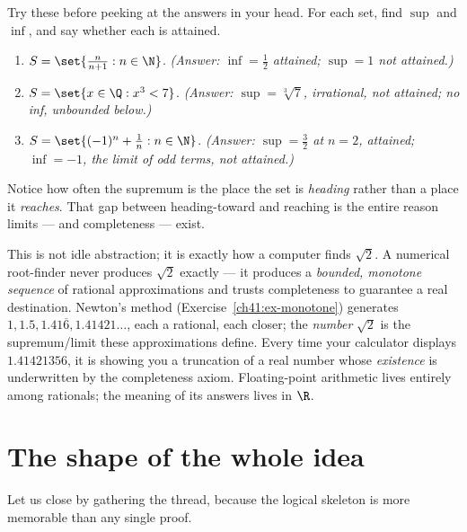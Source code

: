 \begin{labbox}
Try these before peeking at the answers in your head. For each set, find $\sup$ and $\inf$,
and say whether each is attained.
\begin{enumerate}
  \item $S = \set{\tfrac{n}{n+1} : n\in\N}$. \quad
        \emph{(Answer: $\inf=\tfrac12$ attained; $\sup=1$ not attained.)}
  \item $S = \set{x\in\Q : x^3 < 7}$. \quad
        \emph{(Answer: $\sup=\sqrt[3]{7}$, irrational, not attained; no inf, unbounded below.)}
  \item $S = \set{(-1)^n + \tfrac1n : n\in\N}$. \quad
        \emph{(Answer: $\sup=\tfrac32$ at $n=2$, attained; $\inf=-1$, the limit of odd
        terms, \emph{not} attained.)}
\end{enumerate}
Notice how often the supremum is the place the set is \emph{heading} rather than a place it
\emph{reaches}. That gap between heading-toward and reaching is the entire reason limits ---
and completeness --- exist.
\end{labbox}

\begin{applicationbox}
This is not idle abstraction; it is exactly how a computer finds $\sqrt2$. A numerical
root-finder never produces $\sqrt2$ exactly --- it produces a \emph{bounded, monotone
sequence} of rational approximations and trusts completeness to guarantee a real
destination. Newton's method (Exercise~\ref{ch41:ex-monotone}) generates
$1, 1.5, 1.41\overline{6}, 1.41421\ldots$, each a rational, each closer; the
\emph{number} $\sqrt2$ is the supremum/limit these approximations define. Every time your
calculator displays $1.41421356$, it is showing you a truncation of a real number whose
\emph{existence} is underwritten by the completeness axiom. Floating-point arithmetic lives
entirely among rationals; the meaning of its answers lives in $\R$.
\end{applicationbox}

\section{The shape of the whole idea}
\label{ch41:shape}

Let us close by gathering the thread, because the logical skeleton is more memorable than
any single proof.

